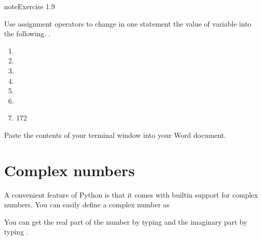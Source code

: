 \documentclass[letterpaper,10pt,english]{jupyterBook}
\begin{document}
\begin{sphinxadmonition}{note}{Exercise 1.9}

\sphinxAtStartPar
Use assignment operators to change \sphinxhyphen{} in one statement \sphinxhyphen{} the value of variable  into the following. .
\begin{enumerate}
%
\item {} 

\item {} 

\item {} 

\item {} 

\item {} 

\item {} 

\item {} 
\sphinxAtStartPar
\sphinxhyphen{}172

\end{enumerate}

\sphinxAtStartPar
Paste the contents of your terminal window into your Word document.
\end{sphinxadmonition}


\section{Complex numbers}
\label{\detokenize{notebooks/01_GettingStarted/01_GettingStarted_student:complex-numbers}}
\sphinxAtStartPar
A convenient feature of Python is that it comes with built\sphinxhyphen{}in support for complex numbers. You can easily define a complex number as

\begin{sphinxVerbatim}[commandchars=\\\{\}]
    
\end{sphinxVerbatim}

\sphinxAtStartPar
You can get the real part of the number by typing  and the imaginary part by typing .
\end{document}
